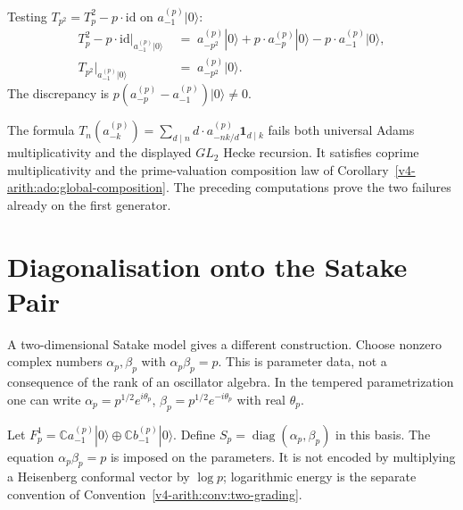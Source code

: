 \begin{observation}
\label{v4-arith:obs:recursion-discrepancy}
Testing \(T_{p^{2}}=T_{p}^{2}-p\cdot\mathrm{id}\) on \(a^{(p)}_{-1}|0\rangle\):
\begin{align}
T_{p}^{2}-p\cdot\mathrm{id}\bigr|_{a^{(p)}_{-1}|0\rangle}
&\;=\;a^{(p)}_{-p^{2}}|0\rangle+p\cdot a^{(p)}_{-p}|0\rangle-p\cdot a^{(p)}_{-1}|0\rangle, \\
T_{p^{2}}\bigr|_{a^{(p)}_{-1}|0\rangle}
&\;=\;a^{(p)}_{-p^{2}}|0\rangle.
\end{align}
The discrepancy is \(p(a^{(p)}_{-p}-a^{(p)}_{-1})|0\rangle\neq 0\).
\end{observation}

\begin{corollary}[falsification]
\label{v4-arith:cor:recursion-falsified}
The formula
\(T_{n}(a^{(p)}_{-k})=\sum_{d\mid n}d\cdot a^{(p)}_{-nk/d}\mathbf{1}_{d\mid k}\)
fails both universal Adams multiplicativity and the displayed
\(GL_2\) Hecke recursion. It satisfies coprime multiplicativity and
the prime-valuation composition law of
Corollary~\ref{v4-arith:ado:global-composition}. The preceding computations
prove the two failures already on the first generator.
\end{corollary}

\section{Diagonalisation onto the Satake Pair}
\label{v4-arith:kb:correction-satake-diagonalisation}

A two-dimensional Satake model gives a different construction.
Choose nonzero complex numbers \(\alpha_p,\beta_p\) with
\(\alpha_p\beta_p=p\). This is parameter data, not a consequence of the
rank of an oscillator algebra. In the tempered parametrization one can
write \(\alpha_p=p^{1/2}e^{i\theta_p}\),
\(\beta_p=p^{1/2}e^{-i\theta_p}\) with real \(\theta_p\).

\begin{definition}
\label{v4-arith:def:satake-diagonalised}
Let \(F_p^1=\mathbb C a^{(p)}_{-1}|0\rangle\oplus
\mathbb C b^{(p)}_{-1}|0\rangle\). Define
\(S_p=\operatorname{diag}(\alpha_p,\beta_p)\) in this basis.
The equation \(\alpha_p\beta_p=p\) is imposed on the parameters.
It is not encoded by multiplying a Heisenberg conformal vector by
\(\log p\); logarithmic energy is the separate convention of
Convention~\ref{v4-arith:conv:two-grading}.
\end{definition}

